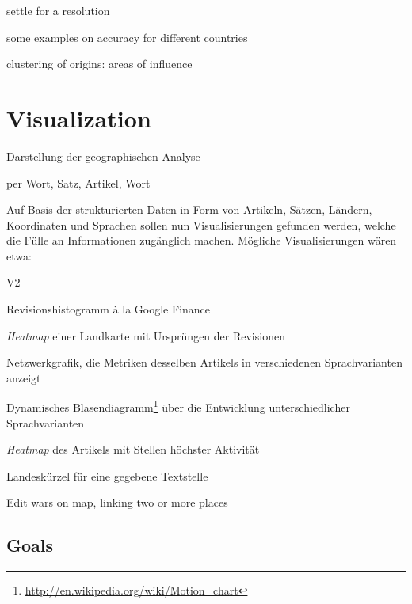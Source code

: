 \begin{todos}
    \item settle for a resolution
    \item some examples on accuracy for different countries
    \item clustering of origins: areas of influence
\end{todos}



\section{Visualization}

\begin{todos}
    \item Darstellung der geographischen Analyse
    \item per Wort, Satz, Artikel, Wort
\end{todos}

Auf Basis der strukturierten Daten in Form von Artikeln, Sätzen, Ländern, Koordinaten und Sprachen sollen nun Visualisierungen gefunden werden, welche die Fülle an Informationen zugänglich machen.
Mögliche Visualisierungen wären etwa:

\begin{labeling}{V2}
\item[V1] Revisionshistogramm à la Google Finance 
\item[V2] \emph{Heatmap} einer Landkarte mit Ursprüngen der Revisionen 
\item[V3] Netzwerkgrafik, die Metriken desselben Artikels in verschiedenen Sprachvarianten anzeigt
\item[V4] Dynamisches Blasendiagramm\footnote{\url{http://en.wikipedia.org/wiki/Motion_chart}} über die Entwicklung unterschiedlicher Sprachvarianten
\item[V5] \emph{Heatmap} des Artikels mit Stellen höchster Aktivität 
\item[V6] Landeskürzel für eine gegebene Textstelle
\item[V7] Edit wars on map, linking two or more places
\end{labeling}


\subsection{Goals}

